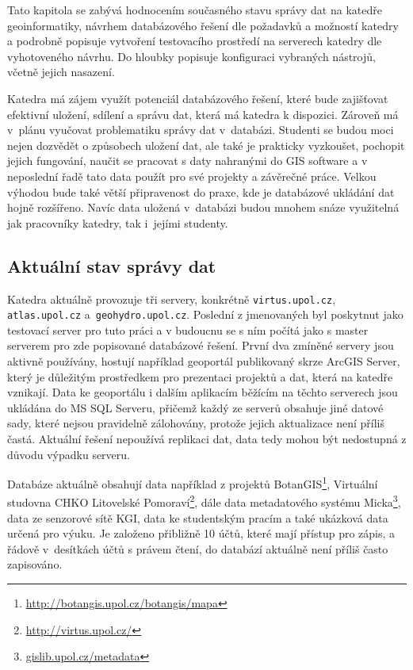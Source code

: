 Tato kapitola se zabývá hodnocením současného stavu správy dat na katedře
geoinformatiky, návrhem databázového řešení dle požadavků a možností katedry a
podrobně popisuje vytvoření testovacího prostředí na serverech katedry dle
vyhotoveného návrhu. Do hloubky popisuje konfiguraci vybraných nástrojů, včetně
jejich nasazení.

Katedra má zájem využít potenciál databázového řešení, které bude zajišťovat efektivní uložení, sdílení a správu dat, která má katedra k dispozici. Zároveň má v~plánu vyučovat problematiku správy dat v~databázi. Studenti se budou moci nejen dozvědět o způsobech uložení dat, ale také je prakticky vyzkoušet, pochopit jejich fungování, naučit se pracovat s daty nahranými do GIS software a v neposlední řadě tato data použít pro své projekty a závěrečné práce. Velkou výhodou bude také větší připravenost do praxe, kde je databázové ukládání dat hojně rozšířeno. Navíc data uložená v~databázi budou mnohem snáze využitelná jak pracovníky katedry, tak i~jejími studenty. 

\subsection{Aktuální stav správy dat}
\label{kAktualniStav}

Katedra aktuálně provozuje tři servery, konkrétně \texttt{virtus.upol.cz}, \texttt{atlas.upol.cz} a~\texttt{geo\-hydro.upol.cz}. Poslední z jmenovaných byl poskytnut jako testovací server pro tuto práci a v budoucnu se s ním počítá jako s master serverem pro zde popisované databázové řešení. První dva zmíněné servery jsou aktivně používány, hostují nap\-řík\-lad geoportál publikovaný skrze ArcGIS Server, který je důležitým prostředkem pro prezentaci projektů a dat, která na katedře vznikají. Data ke geoportálu i dalším aplikacím běžícím na těchto serverech jsou ukládána do MS SQL Serveru, přičemž každý ze serverů obsahuje jiné datové sady, které nejsou pravidelně zálohovány, protože jejich aktualizace není příliš častá. Aktuální řešení nepoužívá replikaci dat, data tedy mohou být nedostupná z důvodu výpadku serveru. 

Databáze aktuálně obsahují data například z projektů BotanGIS\footnote{\url{http://botangis.upol.cz/botangis/mapa}}, Virtuální studovna CHKO Litovelské Pomoraví\footnote{\url{http://virtus.upol.cz/}}, dále data metadatového systému Micka\footnote{\url{gislib.upol.cz/metadata}}, data ze senzorové sítě KGI, data ke studentským pracím a také ukázková data určená pro výuku. Je založeno přibližně 10 účtů, které mají přístup pro zápis, a řádově v~desítkách účtů s právem čtení, do databází aktuálně není příliš často zapisováno. 

